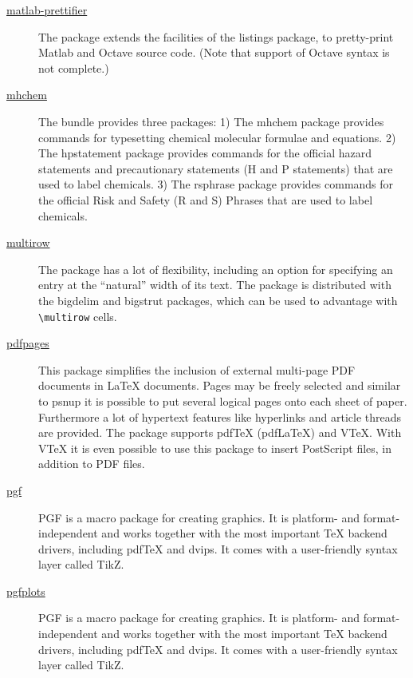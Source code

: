 \begin{description}
	\item[\href{https://www.ctan.org/pkg/matlab-prettifier}{matlab-prettifier}] The package extends the facilities of the listings package, to pretty-print Matlab and Octave source code. (Note that support of Octave syntax is not complete.) \cite{CTANTeam.2020ab}
	
	\item[\href{https://www.ctan.org/pkg/mhchem}{mhchem}] The bundle provides three packages: 1) The mhchem package provides commands for typesetting chemical molecular formulae and equations. 2) The hpstatement package provides commands for the official hazard statements and precautionary statements (H and P statements) that are used to label chemicals. 3) The rsphrase package provides commands for the official Risk and Safety (R and S) Phrases that are used to label chemicals. \cite{CTANTeam.2020t}
	
	\item[\href{https://www.ctan.org/pkg/multirow}{multirow}] The package has a lot of flexibility, including an option for specifying an entry at the \enquote{natural} width of its text. The package is distributed with the bigdelim and bigstrut packages, which can be used to advantage with \verb|\multirow| cells. \cite{CTANTeam.2020q}
	
	\item[\href{https://www.ctan.org/pkg/pdfpages}{pdfpages}] This package simplifies the inclusion of external multi-page PDF documents in {\LaTeX} documents. Pages may be freely selected and similar to psnup it is possible to put several logical pages onto each sheet of paper. Furthermore a lot of hypertext features like hyperlinks and article threads are provided. The package supports pdf{\TeX} (pdf{\LaTeX}) and V{\TeX}. With V{\TeX} it is even possible to use this package to insert PostScript files, in addition to PDF files. \cite{CTANTeam.2020ay}
	
	\item[\href{https://www.ctan.org/pkg/pgf}{pgf}] PGF is a macro package for creating graphics. It is platform- and format-independent and works together with the most important {\TeX} backend drivers, including pdf{\TeX} and dvips. It comes with a user-friendly syntax layer called TikZ. \cite{CTANTeam.2020m}
	
	\item[\href{https://www.ctan.org/pkg/pgfplots}{pgfplots}] PGF is a macro package for creating graphics. It is platform- and format-independent and works together with the most important {\TeX} backend drivers, including pdf{\TeX} and dvips. It comes with a user-friendly syntax layer called TikZ. \cite{CTANTeam.2020m}
	

\end{description}
